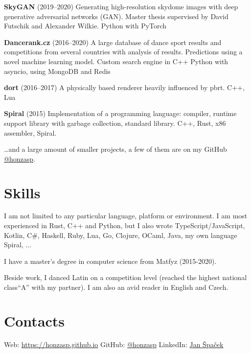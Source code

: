 \documentclass[10pt,a4paper]{article}
\begin{document}
\begin{multicols}{2}
\textbf{SkyGAN} (2019–2020)
  \newline Generating high-resolution skydome images with deep generative
  adversarial networks (GAN).
  \newline Master thesis supervised by David Futschik and Alexander Wilkie.
  \newline Python with PyTorch

\textbf{Dancerank.cz} (2016–2020)
  \newline A large database of dance sport results and competitions from several
  countries with analysis of results.
  \newline Predictions using a novel machine learning model.
  \newline Custom search engine in C++
  \newline Python with asyncio, using MongoDB and Redis

\textbf{dort} (2016–2017)
  \newline A physically based renderer heavily influenced by pbrt.
  \newline C++, Lua

\textbf{Spiral} (2015)
  \newline Implementation of a programming language: compiler, runtime support
  library with garbage collection, standard library.
  \newline C++, Rust, x86 assembler, Spiral.

\ldots{}and a large amount of smaller projects, a few of them are on my GitHub 
\href{https://github.com/honzasp}{@honzasp}.

\section*{Skills}

I am not limited to any particular language, platform or environment. I am most
experienced in Rust, C++ and Python, but I also wrote
{\small TypeScript/JavaScript, Kotlin,}
{\footnotesize C\#, Haskell, Ruby, Lua, Go,}
{\scriptsize Clojure, OCaml, Java, my own language Spiral, ...}

I have a master's degree in computer science from Matfyz (2015-2020).

Beside work, I danced Latin on a competition level (reached the highest national
class``A'' with my partner). I am also an avid reader in English and Czech.

\section*{Contacts}

Web: \url{https://honzasp.github.io}\newline
GitHub: \href{https://github.com/honzasp}{@honzasp}\newline
LinkedIn: \href{https://www.linkedin.com/in/honzasp}{Jan Špaček}\newline

\end{multicols}
\end{document}
